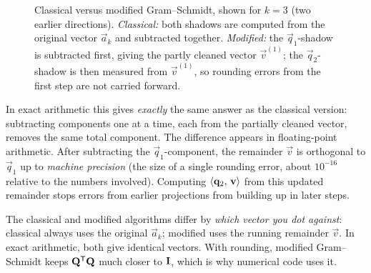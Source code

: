 \begin{figure}[htbp]
\caption{Classical versus modified Gram--Schmidt, shown for $k=3$ (two earlier directions).
\emph{Classical:} both shadows are computed from the original vector $\vec{a}_k$ and
subtracted together. \emph{Modified:} the $\vec{q}_1$-shadow is subtracted first, giving the
partly cleaned vector $\vec{v}^{(1)}$; the $\vec{q}_2$-shadow is then measured from
$\vec{v}^{(1)}$, so rounding errors from the first step are not carried forward.}
\label{ch20:cgs-vs-mgs}
\end{figure}

In exact arithmetic this gives \emph{exactly} the same answer as the classical
version: subtracting components one at a time, each from the partially cleaned vector,
removes the same total component. The difference appears in floating-point arithmetic.
After subtracting the $\vec{q}_1$-component, the remainder $\vec{v}$ is orthogonal to
$\vec{q}_1$ up to \emph{machine precision} (the size of a single rounding error, about
$10^{-16}$ relative to the numbers involved). Computing $\langle \mathbf{q}_2,\, \mathbf{v} \rangle$
from this updated remainder stops errors from earlier
projections from building up in later steps.

\begin{trapbox}
The classical and modified algorithms differ by \emph{which vector you dot against}:
classical always uses the original $\vec{a}_k$; modified uses the running remainder
$\vec{v}$. In exact arithmetic, both give identical vectors. With rounding,
modified Gram--Schmidt keeps $\mathbf{Q}^{\mathsf{T}}\mathbf{Q}$ much closer
to $\mathbf{I}$, which is why numerical code uses it.
\end{trapbox}

